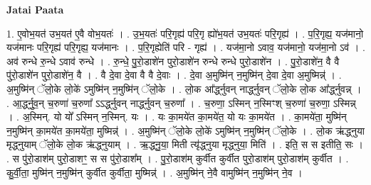\documentclass[17pt]{extarticle}
\begin{document}
\textbf{Jatai Paata} \newline

1. ए॒वोभ॒यत॑ उभ॒यत॑ ए॒वै वोभ॒यतः॑ । . उ॒भ॒यतः॑ परि॒गृह्य॑ परि॒गृ ह्यो॑भ॒यत॑ उभ॒यतः॑ परि॒गृह्य॑ । . प॒रि॒गृह्य॒ यज॑मानो॒ यज॑मानः परि॒गृह्य॑ परि॒गृह्य॒ यज॑मानः । . प॒रि॒गृह्येति॑ परि - गृह्य॑ । . यज॑मा॒नो ऽवाव॒ यज॑मानो॒ यज॑मा॒नो ऽव॑ । . अव॑ रुन्धे रु॒न्धे ऽवाव॑ रुन्धे । . रु॒न्धे॒ पु॒रो॒डाशे॑न पुरो॒डाशे॑न रुन्धे रुन्धे पुरो॒डाशे॑न । . पु॒रो॒डाशे॑न॒ वै वै पु॑रो॒डाशे॑न पुरो॒डाशे॑न॒ वै । . वै दे॒वा दे॒वा वै वै दे॒वाः । . दे॒वा अ॒मुष्मि॑न् न॒मुष्मि॑न् दे॒वा दे॒वा अ॒मुष्मिन्न्॑ । . अ॒मुष्मि॑न् ॅलो॒के लो॒के॑ ऽमुष्मि॑न् न॒मुष्मि॑न् ॅलो॒के । . लो॒क आ᳚र्द्ध्नुवन् नार्द्ध्नुवन् ॅलो॒के लो॒क आ᳚र्द्ध्नुवन्न् । . आ॒र्द्ध्नु॒व॒न् च॒रुणा॑ च॒रुणा᳚ ऽऽर्द्ध्नुवन् नार्द्ध्नुवन् च॒रुणा᳚ । . च॒रुणा॒ ऽस्मिन् न॒स्मिꣳश् च॒रुणा॑ च॒रुणा॒ ऽस्मिन्न् । . अ॒स्मिन्. यो यो᳚ ऽस्मिन् न॒स्मिन्. यः । . यः का॒मये॑त का॒मये॑त॒ यो यः का॒मये॑त । . का॒मये॑ता॒ मुष्मि॑न् न॒मुष्मि॑न् का॒मये॑त का॒मये॑ता॒ मुष्मिन्न्॑ । . अ॒मुष्मि॑न् ॅलो॒के लो॒के॑ ऽमुष्मि॑न् न॒मुष्मि॑न् ॅलो॒के । . लो॒क ऋ॑द्ध्नुया मृद्ध्नुयाम् ॅलो॒के लो॒क ऋ॑द्ध्नुयाम् । . ऋ॒द्ध्नु॒या॒ मिती त्यृ॑द्ध्नुया मृद्ध्नुया॒ मिति॑ । . इति॒ स स इतीति॒ सः । . स पु॑रो॒डाश॑म् पुरो॒डाशꣳ॒॒ स स पु॑रो॒डाश᳚म् । . पु॒रो॒डाश॑म् कुर्वीत कुर्वीत पुरो॒डाश॑म् पुरो॒डाश॑म् कुर्वीत । . कु॒र्वी॒ता॒ मुष्मि॑न् न॒मुष्मि॑न् कुर्वीत कुर्वीता॒ मुष्मिन्न्॑ । . अ॒मुष्मि॑न् ने॒वै वामुष्मि॑न् न॒मुष्मि॑न् ने॒व । \newline
\end{document}
